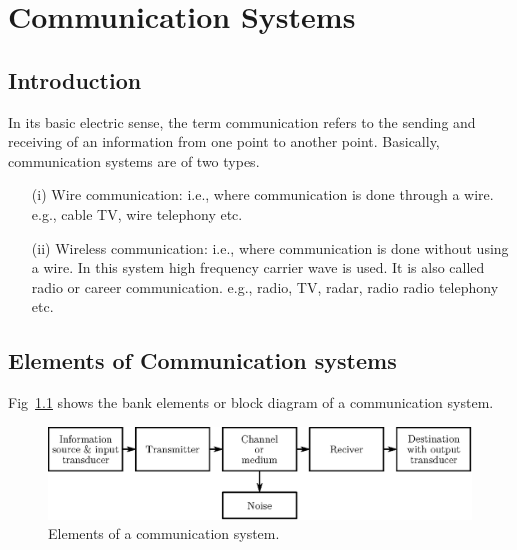 \makeatletter
\def\@makechapterhead#1{%
  \vspace*{10\p@}%
  {\parindent \z@ \raggedleft \normalfont
    \ifnum \c@secnumdepth >\m@ne
      \if@mainmatter
        \LARGE\bfseries \@chapapp\space \thechapter
	\vskip 4pt
        \hrule height 2pt
        \par\nobreak
        \vskip 5\p@
      \fi
    \fi
    \interlinepenalty\@M
    \huge \bfseries #1\par\nobreak
\vskip 5pt

\hrule height 2pt   
 \vskip 10\p@  
  }}
\makeatother

\setcounter{chapter}{7}
\chapter{Communication Systems}\label{chap8}

\section{Introduction}\label{sec8.1}%

In its basic electric sense, the term communication refers to the
sending and receiving of an information from one point to another
point. Basically, communication systems are of two types.
\begin{itemize}
\item[(i)] Wire communication: i.e., where communication is done
  through a wire. e.g., cable TV, wire telephony etc.

\item[(ii)] Wireless communication: i.e., where communication is done
  without using a wire. In this system high frequency carrier wave is
  used. It is also called radio or career communication. e.g.,  radio,
  TV, radar, radio radio telephony etc.
\end{itemize}

\section{Elements of Communication systems}\label{sec.8.2}%

Fig~\ref{fig8.1} shows the bank elements or block diagram of a communication
system.
\begin{figure}[H]
\centering
\includegraphics{chap8/fig8.1.eps}
\caption{Elements of a communication system.}\label{fig8.1}
\end{figure}

